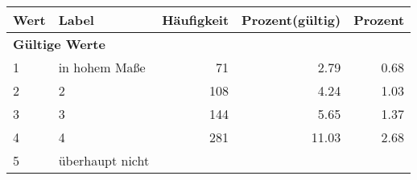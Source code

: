      \begin{longtable}{lXrrr}
     \toprule
     \textbf{Wert} & \textbf{Label} & \textbf{Häufigkeit} & \textbf{Prozent(gültig)} & \textbf{Prozent} \\
     \endhead
     \midrule
     \multicolumn{5}{l}{\textbf{Gültige Werte}}\\

     1 &
     \multicolumn{1}{X}{ in hohem Maße   } &


       \num{71} &
       \num[round-mode=places,round-precision=2]{2,79} &
         \num[round-mode=places,round-precision=2]{0,68} \\

     2 &
     \multicolumn{1}{X}{ 2   } &


       \num{108} &
       \num[round-mode=places,round-precision=2]{4,24} &
         \num[round-mode=places,round-precision=2]{1,03} \\

     3 &
     \multicolumn{1}{X}{ 3   } &


       \num{144} &
       \num[round-mode=places,round-precision=2]{5,65} &
         \num[round-mode=places,round-precision=2]{1,37} \\

     4 &
     \multicolumn{1}{X}{ 4   } &


       \num{281} &
       \num[round-mode=places,round-precision=2]{11,03} &
         \num[round-mode=places,round-precision=2]{2,68} \\

     5 &
     \multicolumn{1}{X}{ überhaupt nicht   } &



\end{longtable}
